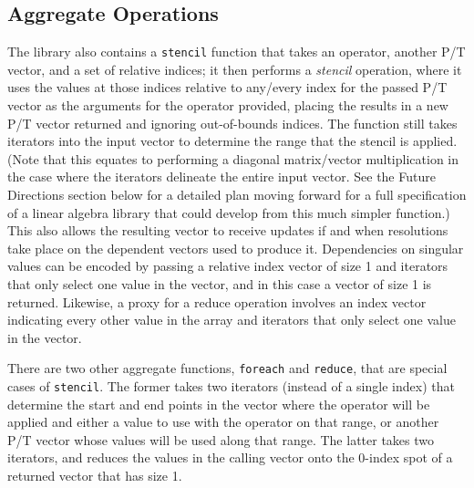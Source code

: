 \subsection{Aggregate Operations}
The library also contains a \texttt{stencil} function that takes an operator,
another P/T vector, and a set of relative indices; it then performs a 
\textit{stencil} operation, where it uses the values at those indices relative to
any/every index for the passed P/T vector as the arguments for the operator
provided, placing the results in a new P/T vector returned and ignoring
out-of-bounds indices. The function still takes iterators into the input vector
to determine the range that the stencil is applied. (Note that this equates to
performing a diagonal matrix/vector multiplication in the case where the iterators
delineate the entire input vector. See the Future Directions section below for a
detailed plan moving forward for a full specification of a linear algebra
library that could develop from this much simpler function.) This also allows
the resulting vector to receive updates if and when resolutions take place on
the dependent vectors used to produce it. Dependencies on singular values can be
encoded by passing a relative index vector of size 1 and iterators that only
select one value in the vector, and in this case a vector of size 1 is returned.
Likewise, a proxy for a reduce operation involves an index vector indicating
every other value in the array and iterators that only select one value in the
vector.

There are two other aggregate functions, \texttt{foreach} and \texttt{reduce}, that are
special cases of \texttt{stencil}. The
former takes two iterators (instead of a single index) that determine the start
and end points in the vector where the operator will be applied and either a value to use 
with the operator on that range, or another P/T vector whose values will be used along 
that range. The latter takes two iterators, and reduces the values in the calling 
vector onto the 0-index spot of a returned vector that has size 1.


